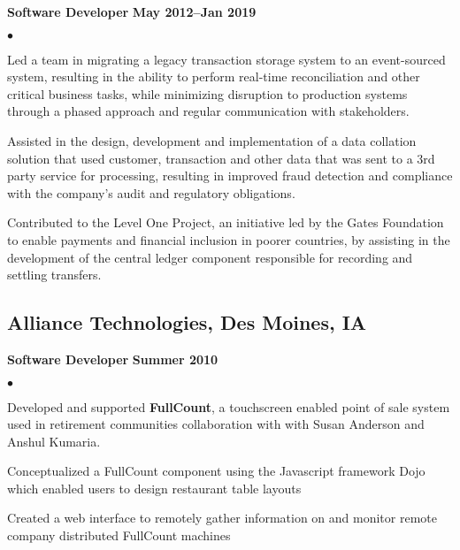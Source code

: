 \documentclass[10pt,letterpaper]{article}
\renewenvironment{itemize}{
  \begin{list}{}{
      \setlength{\leftmargin}{1.5em}
      \setlength{\itemsep}{0.25em}
      \setlength{\parskip}{0pt}
      \setlength{\parsep}{0.25em}
    }
  }{
  \end{list}
}
\newenvironment{bitemize}{
  \begin{list}{\(\bullet \)}{
      \setlength{\leftmargin}{1.5em}
      \setlength{\itemsep}{0.25em}
      \setlength{\parskip}{0pt}
      \setlength{\parsep}{0.25em}
    }
  }{
  \end{list}
}
\newcommand{\yearrange}[1]{\hfill \textbf{#1} \par}
\begin{document}
\begin{itemize}
  \item \textbf{Software Developer} \yearrange{May 2012--Jan 2019}
  \begin{bitemize}
    \item Led a team in migrating a legacy transaction storage system to an
      event-sourced system, resulting in the ability to perform real-time
      reconciliation and other critical business tasks, while minimizing
      disruption to production systems through a phased approach and regular
      communication with stakeholders.
    \item Assisted in the design, development and implementation of a data
      collation solution that used customer, transaction and other data that was
      sent to a 3rd party service for processing, resulting in improved fraud
      detection and compliance with the company's audit and regulatory
      obligations.
    \item Contributed to the Level One Project, an initiative led by the Gates
      Foundation to enable payments and financial inclusion in poorer countries,
      by assisting in the development of the central ledger component
      responsible for recording and settling transfers.
  \end{bitemize}
\end{itemize}

\subsection*{Alliance Technologies, Des Moines, IA}

\begin{itemize}
  \item \textbf{Software Developer} \yearrange{Summer 2010}
    \begin{bitemize}
    \item Developed and supported \textbf{FullCount}, a touchscreen enabled
      point of sale system used in retirement communities %
      collaboration with with Susan Anderson and Anshul Kumaria.
    \item Conceptualized a FullCount component using the Javascript framework
      Dojo which enabled users to design restaurant table layouts
    \item Created a web interface to remotely gather information on and monitor
      remote company distributed FullCount machines
  \end{bitemize}
\end{itemize}
\end{document}
